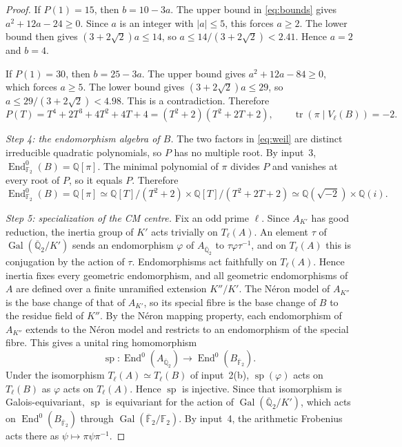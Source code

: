 \documentclass[11pt]{article}
\newcommand{\Q}{\mathbb Q}
\newcommand{\F}{\mathbb F}
\DeclareMathOperator{\End}{End}
\DeclareMathOperator{\Gal}{Gal}
\DeclareMathOperator{\tr}{tr}
\DeclareMathOperator{\spe}{sp}
\begin{document}
\begin{proof}
If \(P(1)=15\), then \(b=10-3a\). The upper bound in
\eqref{eq:bounds} gives \(a^2+12a-24\ge0\). Since \(a\) is an integer
with \(|a|\le5\), this forces \(a\ge2\). The lower bound then gives
\((3+2\sqrt2)a\le14\), so \(a\le14/(3+2\sqrt2)<2.41\). Hence \(a=2\)
and \(b=4\).

If \(P(1)=30\), then \(b=25-3a\). The upper bound gives
\(a^2+12a-84\ge0\), which forces \(a\ge5\). The lower bound gives
\((3+2\sqrt2)a\le29\), so \(a\le29/(3+2\sqrt2)<4.98\). This is a
contradiction. Therefore
\begin{equation}\label{eq:weil}
 P(T)=T^4+2T^3+4T^2+4T+4=(T^2+2)(T^2+2T+2),\qquad
 \tr(\pi\mid V_\ell(B))=-2.
\end{equation}

\emph{Step 4: the endomorphism algebra of \(B\).} The two factors in
\eqref{eq:weil} are distinct irreducible quadratic polynomials, so
\(P\) has no multiple root. By input~3,
\(\End^0_{\F_2}(B)=\Q[\pi]\). The minimal polynomial of \(\pi\)
divides \(P\) and vanishes at every root of \(P\), so it equals \(P\).
Therefore
\begin{equation}\label{eq:endB}
 \End^0_{\F_2}(B)=\Q[\pi]\simeq\Q[T]/(T^2+2)\times\Q[T]/(T^2+2T+2)
 \simeq\Q(\sqrt{-2})\times\Q(i).
\end{equation}

\emph{Step 5: specialization of the CM centre.} Fix an odd prime
\(\ell\). Since \(A_{K'}\) has good reduction, the inertia group of
\(K'\) acts trivially on \(T_\ell(A)\). An element \(\tau\) of
\(\Gal(\overline{\Q}_2/K')\) sends an endomorphism \(\varphi\) of
\(A_{\overline{\Q}_2}\) to \(\tau\varphi\tau^{-1}\), and on
\(T_\ell(A)\) this is conjugation by the action of \(\tau\).
Endomorphisms act faithfully on \(T_\ell(A)\). Hence inertia fixes
every geometric endomorphism, and all geometric endomorphisms of \(A\)
are defined over a finite unramified extension \(K''/K'\). The N\'eron
model of \(A_{K''}\) is the base change of that of \(A_{K'}\), so its
special fibre is the base change of \(B\) to the residue field of
\(K''\). By the N\'eron mapping property, each endomorphism of
\(A_{K''}\) extends to the N\'eron model and restricts to an
endomorphism of the special fibre. This gives a unital ring
homomorphism
\[
 \spe:\End^0(A_{\overline{\Q}_2})\longrightarrow
 \End^0(B_{\overline{\F}_2}).
\]
Under the isomorphism \(T_\ell(A)\simeq T_\ell(B)\) of input~2(b),
\(\spe(\varphi)\) acts on \(T_\ell(B)\) as \(\varphi\) acts on
\(T_\ell(A)\). Hence \(\spe\) is injective. Since that isomorphism is
Galois-equivariant, \(\spe\) is equivariant for the action of
\(\Gal(\overline{\Q}_2/K')\), which acts on
\(\End^0(B_{\overline{\F}_2})\) through \(\Gal(\overline{\F}_2/\F_2)\).
By input~4, the arithmetic Frobenius acts there as
\(\psi\mapsto\pi\psi\pi^{-1}\).


\end{proof}
\end{document}
